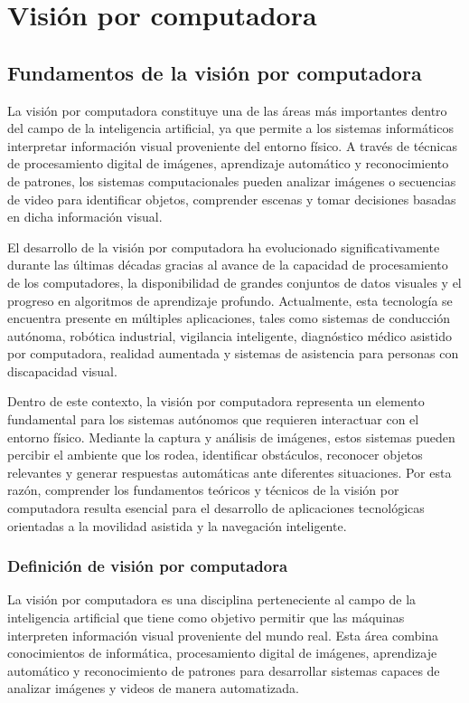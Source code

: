 \section{Visión por computadora}

\subsection{Fundamentos de la visión por computadora}
La visión por computadora constituye una de las áreas más importantes dentro del campo de la inteligencia artificial, ya que permite a los sistemas informáticos interpretar información visual proveniente del entorno físico. A través de técnicas de procesamiento digital de imágenes, aprendizaje automático y reconocimiento de patrones, los sistemas computacionales pueden analizar imágenes o secuencias de video para identificar objetos, comprender escenas y tomar decisiones basadas en dicha información visual.

El desarrollo de la visión por computadora ha evolucionado significativamente durante las últimas décadas gracias al avance de la capacidad de procesamiento de los computadores, la disponibilidad de grandes conjuntos de datos visuales y el progreso en algoritmos de aprendizaje profundo. Actualmente, esta tecnología se encuentra presente en múltiples aplicaciones, tales como sistemas de conducción autónoma, robótica industrial, vigilancia inteligente, diagnóstico médico asistido por computadora, realidad aumentada y sistemas de asistencia para personas con discapacidad visual.

Dentro de este contexto, la visión por computadora representa un elemento fundamental para los sistemas autónomos que requieren interactuar con el entorno físico. Mediante la captura y análisis de imágenes, estos sistemas pueden percibir el ambiente que los rodea, identificar obstáculos, reconocer objetos relevantes y generar respuestas automáticas ante diferentes situaciones. Por esta razón, comprender los fundamentos teóricos y técnicos de la visión por computadora resulta esencial para el desarrollo de aplicaciones tecnológicas orientadas a la movilidad asistida y la navegación inteligente.



\subsubsection{Definición de visión por computadora}
La visión por computadora es una disciplina perteneciente al campo de la inteligencia artificial que tiene como objetivo permitir que las máquinas interpreten información visual proveniente del mundo real. Esta área combina conocimientos de informática, procesamiento digital de imágenes, aprendizaje automático y reconocimiento de patrones para desarrollar sistemas capaces de analizar imágenes y videos de manera automatizada.

